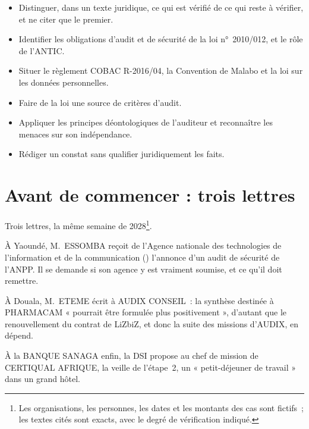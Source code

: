 \begin{boxobjectifs}
\begin{itemize}
    \item Distinguer, dans un texte juridique, ce qui est vérifié de ce qui
          reste à vérifier, et ne citer que le premier.
    \item Identifier les obligations d'audit et de sécurité de la loi
          n°~2010/012, et le rôle de l'ANTIC.
    \item Situer le règlement COBAC R-2016/04, la Convention de Malabo et
          la loi sur les données personnelles.
    \item Faire de la loi une source de critères d'audit.
    \item Appliquer les principes déontologiques de l'auditeur et
          reconnaître les menaces sur son indépendance.
    \item Rédiger un constat sans qualifier juridiquement les faits.
\end{itemize}
\end{boxobjectifs}

\bigskip

\section*{Avant de commencer : trois lettres}

Trois lettres, la même semaine de 2028\footnote{Les organisations, les
personnes, les dates et les montants des cas sont fictifs~; les textes
cités sont exacts, avec le degré de vérification indiqué.}.

À Yaoundé, M.~ESSOMBA reçoit de l'Agence nationale des technologies de
l'information et de la communication () l'annonce d'un audit
de sécurité de l'ANPP. Il se demande si son agence y est vraiment soumise,
et ce qu'il doit remettre.

À Douala, M.~ETEME écrit à AUDIX CONSEIL~: la synthèse destinée à
PHARMACAM « pourrait être formulée plus positivement », d'autant que le
renouvellement du contrat de LiZbiZ, et donc la suite des missions
d'AUDIX, en dépend.

À la BANQUE SANAGA enfin, la DSI propose au chef de mission de CERTIQUAL
AFRIQUE, la veille de l'étape~2, un « petit-déjeuner de travail » dans un
grand hôtel.

\medskip


